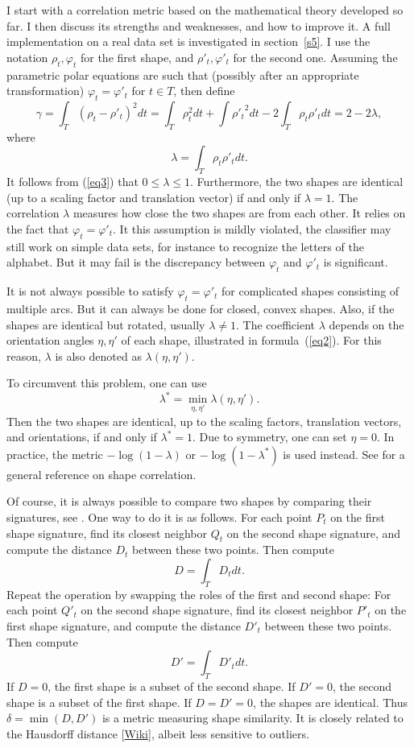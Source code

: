 \documentclass[oneside,10pt]{book}
\begin{document}
I start with a correlation metric based on the mathematical theory developed so far. I then discuss its strengths and weaknesses, and how to improve it. A full implementation on a real data set is investigated in section~\ref{s5}. I use the notation $\rho_t, \varphi_t$ for the first shape, 
and $\rho'_t, \varphi'_t$ for the second one. Assuming the parametric polar equations are such that (possibly after an appropriate transformation) $\varphi_t = \varphi'_t$ for $t\in T$, then define
$$\gamma = \int_T (\rho_t - \rho'_t)^2 dt =  \int_T \rho_t^2 dt + \int {\rho'_t}^2 dt - 2\int_T \rho_t\rho'_t dt =2 - 2\lambda, $$
where 
$$\lambda = \int_T \rho_t\rho'_t dt. $$ 
It follows from (\ref{eq3}) that $0\leq \lambda \leq 1$. Furthermore, the two shapes are identical (up to a scaling factor and translation vector) if and only if $\lambda = 1$. The correlation $\lambda$ measures how close the two shapes are from each other. It relies on the fact that $\varphi_t=\varphi'_t$. It this assumption is mildly violated, the classifier may still work on simple data sets, for instance to recognize the letters of the alphabet. But it may fail is the discrepancy between $\varphi_t$ and $\varphi'_t$ is significant. 

It is not always possible to satisfy $\varphi_t=\varphi'_t$ for complicated shapes consisting of multiple arcs. But it can always be done for closed, convex shapes. Also, if the shapes are identical but rotated, usually $\lambda \neq 1$. The coefficient $\lambda$ depends  on the orientation angles $\eta,\eta'$ 
of each shape, illustrated in formula~(\ref{eq2}). For this reason, $\lambda$ is also denoted as  $\lambda(\eta,\eta')$. 

\noindent To circumvent this problem, one can use
$$\lambda^* = \min_{\eta,\eta'} \lambda(\eta,\eta').$$
Then the two shapes are identical, up to the scaling factors, translation vectors, and orientations, if and only if $\lambda^*=1$. Due to symmetry, one can set $\eta=0$. In practice, the metric  $-\log(1-\lambda)$ or $-\log(1-\lambda^*)$ is used instead. See \cite{yuviz2012} for a general reference on shape correlation.

\noindent Of course, it is always possible to compare two shapes by comparing their signatures, see \cite{grauman2008}. One way to do it is as follows. For each point $P_t$ on the first shape signature, find its closest neighbor $Q_t$ on the second shape signature, and compute the distance $D_t$ between these two points. Then compute
$$D = \int_T D_t dt.$$
Repeat the operation by swapping the roles of the first and second shape: For each point $Q'_t$ on the second shape signature, find its closest neighbor $P'_t$ on the first shape signature, and compute the distance $D'_t$ between these two points. Then compute
$$D' = \int_T D'_t dt.$$
If $D=0$, the first shape is a subset of the second shape. If $D'=0$, the second shape is a subset of the first shape. If $D=D'=0$, the shapes are identical. Thus $\delta = \min(D,D')$ is a metric measuring shape similarity. It is closely related to the 
\textcolor{index}{Hausdorff distance} [\href{https://en.wikipedia.org/wiki/Hausdorff_distance}{Wiki}], albeit less
sensitive to outliers.
\end{document}
